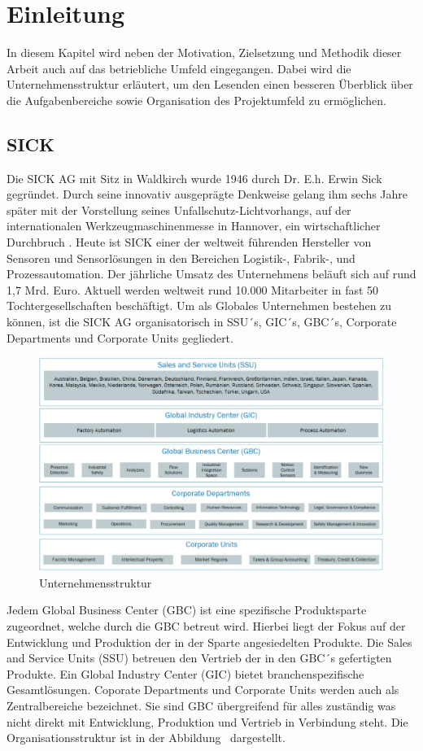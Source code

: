 \onehalfspacing

\section{Einleitung}
In diesem Kapitel wird neben der Motivation, Zielsetzung und Methodik dieser Arbeit auch auf das betriebliche Umfeld eingegangen. Dabei wird die Unternehmensstruktur erläutert, um den Lesenden einen besseren Überblick über die Aufgabenbereiche sowie Organisation des Projektumfeld zu ermöglichen. 
		\subsection{SICK}
		Die SICK AG mit Sitz in Waldkirch wurde 1946 durch Dr. E.h. Erwin Sick gegründet. Durch 		seine innovativ ausgeprägte Denkweise gelang ihm sechs Jahre später mit der Vorstellung 		seines Unfallschutz-Lichtvorhangs, auf der internationalen Werkzeugmaschinenmesse in 			Hannover, ein wirtschaftlicher Durchbruch \cite{SICK.2021}. Heute ist SICK einer der weltweit 				führenden Hersteller von Sensoren und Sensorlösungen in den Bereichen Logistik-, 				Fabrik-, und Prozessautomation. Der jährliche Umsatz des Unternehmens beläuft sich auf 			rund 1,7 Mrd. Euro. Aktuell werden weltweit rund 10.000 Mitarbeiter in fast 50 					Tochtergesellschaften beschäftigt.\cite{SICKAG.2020}
		Um als Globales Unternehmen bestehen zu können, ist die SICK AG organisatorisch in  SSU´s, GIC´s, GBC´s, Corporate Departments und Corporate Units gegliedert.
	\begin{figure}[h]
        \centering
        \includegraphics[width=1\textwidth]{img/OrganigramSick.jpg} 
        \caption[Unternehmensstruktur]{Unternehmensstruktur \cite{SICKAG.2020}}
        \label{fig:OrganigramSick.jpg}
    \end{figure}
Jedem Global Business Center (GBC) ist eine spezifische Produktsparte zugeordnet, welche durch die GBC betreut wird. Hierbei liegt der Fokus auf der Entwicklung und Produktion der in der Sparte angesiedelten Produkte. Die Sales and Service Units (SSU) betreuen den Vertrieb der in den GBC´s gefertigten Produkte. Ein Global Industry Center (GIC) bietet branchenspezifische Gesamtlösungen. Coporate Departments und Corporate Units werden auch als Zentralbereiche bezeichnet. Sie sind GBC übergreifend für alles zuständig was nicht direkt mit Entwicklung, Produktion und Vertrieb in Verbindung steht. Die Organisationsstruktur ist in der Abbildung \dq {}\dq~dargestellt.
